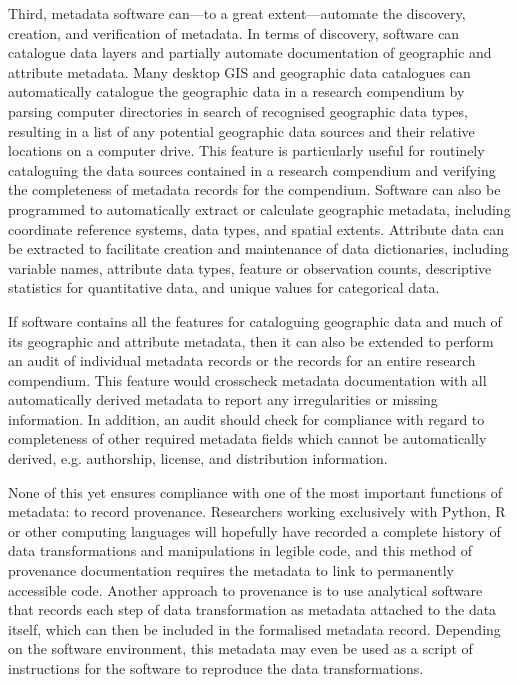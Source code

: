 \documentclass{isprs} %
\begin{document}
Third, metadata software can---to a great extent---automate the discovery, creation, and verification of metadata.
In terms of discovery, software can catalogue data layers and partially automate documentation of geographic and attribute metadata.
Many desktop GIS and geographic data catalogues can automatically catalogue the geographic data in a research compendium by parsing computer directories in search of recognised geographic data types, resulting in a list of any potential geographic data sources and their relative locations on a computer drive.
This feature is particularly useful for routinely cataloguing the data sources contained in a research compendium and verifying the completeness of metadata records for the compendium.
Software can also be programmed to automatically extract or calculate geographic metadata, including coordinate reference systems, data types, and spatial extents.
Attribute data can be extracted to facilitate creation and maintenance of data dictionaries, including variable names, attribute data types, feature or observation counts, descriptive statistics for quantitative data, and unique values for categorical data.

If software contains all the features for cataloguing geographic data and much of its geographic and attribute metadata, then it can also be extended to perform an audit of individual metadata records or the records for an entire research compendium.
This feature would crosscheck metadata documentation with all automatically derived metadata to report any irregularities or missing information.
In addition, an audit should check for compliance with regard to completeness of other required metadata fields which cannot be automatically derived, e.g. authorship, license, and distribution information.

None of this yet ensures compliance with one of the most important functions of metadata: to record provenance.
Researchers working exclusively with Python, R or other computing languages will hopefully have recorded a complete history of data transformations and manipulations in legible code, and this method of provenance documentation requires the metadata to link to permanently accessible code.
Another approach to provenance is to use analytical software that records each step of data transformation as metadata attached to the data itself, which can then be included in the formalised metadata record.
Depending on the software environment, this metadata may even be used as a script of instructions for the software to reproduce the data transformations.
\end{document}
